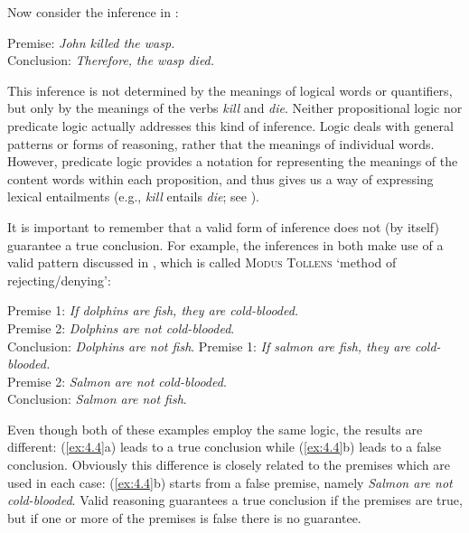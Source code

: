 Now consider the inference in :


\ea \label{ex:4.3}
Premise: \textit{John killed the wasp.\\
}\FelixHRule
Conclusion: \textit{Therefore,} \textit{the wasp died.}
\z


This inference is not determined by the meanings of logical words or quantifiers, but only by the meanings of the verbs \textit{kill} and \textit{die}. Neither propositional logic nor predicate logic actually addresses this kind of inference. Logic deals with general patterns or forms of reasoning, rather that the meanings of individual words. However, predicate logic provides a notation for representing the meanings of the content words within each proposition, and thus gives us a way of expressing lexical entailments (e.g., \textit{kill} entails \textit{die}; see ).



It is important to remember that a valid form of inference does not (by itself) guarantee a true conclusion. For example, the inferences in  both make use of a valid pattern discussed in , which is called \textsc{Modus Tollens} ‘method of rejecting/denying’:


\ea \label{ex:4.4}
\ea  Premise 1: \textit{If dolphins are fish, they are cold-blooded.}\\
Premise 2: \textit{Dolphins are not cold-blooded}.\\
\FelixHRule
Conclusion: \textit{Dolphins are not fish}.
\ex Premise 1: \textit{If salmon are fish, they are cold-blooded.}\\
Premise 2: \textit{Salmon are not cold-blooded}.\\
\FelixHRule
Conclusion: \textit{Salmon are not fish}.
                       \z
\z


Even though both of these examples employ the same logic, the results are different: (\ref{ex:4.4}a) leads to a true conclusion while (\ref{ex:4.4}b) leads to a false conclusion. Obviously this difference is closely related to the premises which are used in each case: (\ref{ex:4.4}b) starts from a false premise, namely \textit{Salmon are not cold-blooded}. Valid reasoning guarantees a true conclusion if the premises are true, but if one or more of the premises is false there is no guarantee.




